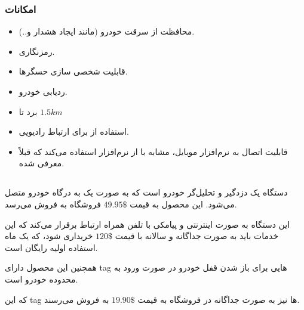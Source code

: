 \documentclass[a4paper,12pt]{report}
\begin{document}
	\subsubsection{
		امکانات
	}\label{subsubsec1:subsec2:sec3:chap1}
	\begin{itemize}[nosep]\label{item1:subsec2:sec3:chap1}
		\item
		محافظت از سرقت خودرو (مانند ایجاد هشدار و..).
		\item
		رمزنگاری.
		\item
		قابلیت شخصی سازی حسگر‌ها.
		\item
		ردیابی خودرو.
		\item
		برد
		تا
		$1.5 km$
		\item
		استفاده از
		برای ارتباط رادیویی.
		\item
		قابلیت اتصال به نرم‌افزار موبایل، مشابه با
		از نرم‌افزار
		استفاده می‌کند که قبلاً معرفی شده.
	\end{itemize}

	\subsection{
	}\label{subsec3:sec3:chap1}
	دستگاه
	یک دزدگیر و تحلیل‌گر خودرو است که به صورت یک
	به درگاه
	خودرو متصل می‌شود.
	این محصول به قیمت
	$49.95\$$
	فروشگاه
	\hyperref{https://www.amazon.com/gp/product/B00U0K3Q10/ref=as_li_tl?ie=UTF8&tag=eastcoastje03-20&camp=1789&creative=9325&linkCode=as2&creativeASIN=B00U0K3Q10&linkId=0d3d80c6869fc7dfbc5d6ccec21c2e97}{car alarm}{carlock}{}
	به فروش می‌رسد.

	این دستگاه به صورت اینترنتی و پیامکی با تلفن ‌همراه ارتباط برقرار می‌کند که این خدمات باید به صورت جداگانه و سالانه با قیمت
	$120\$$
	خریداری شود، که یک ماه استفاده اولیه رایگان است.

	همچنین این محصول دارای
	tag
	هایی برای باز شدن قفل خودرو در صورت ورود به محدوده خودرو است.

	که این
	tag
	ها نیز به صورت جداگانه در فروشگاه
	\hyperref{https://www.amazon.com/CARLOCK-TAG-Accessory-ONLY-Automatically/dp/B075F4SWZ7}{car alarm}{carlocktag}{}
	به قیمت
	$19.90\$$
	به فروش می‌رسند.
	\cite{carAlarm:online}
\end{document}
